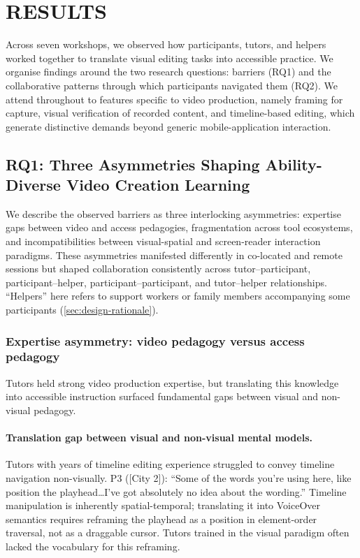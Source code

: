 \section{RESULTS}
\label{sec:results}

Across seven workshops, we observed how participants, tutors, and helpers worked together to translate visual editing tasks into accessible practice. We organise findings around the two research questions: barriers (RQ1) and the collaborative patterns through which participants navigated them (RQ2). We attend throughout to features specific to video production, namely framing for capture, visual verification of recorded content, and timeline-based editing, which generate distinctive demands beyond generic mobile-application interaction.

\subsection{RQ1: Three Asymmetries Shaping Ability-Diverse Video Creation Learning}

We describe the observed barriers as three interlocking asymmetries: expertise gaps between video and access pedagogies, fragmentation across tool ecosystems, and incompatibilities between visual-spatial and screen-reader interaction paradigms. These asymmetries manifested differently in co-located and remote sessions but shaped collaboration consistently across tutor--participant, participant--helper, participant--participant, and tutor--helper relationships. ``Helpers'' here refers to support workers or family members accompanying some participants (\autoref{sec:design-rationale}).

\subsubsection{Expertise asymmetry: video pedagogy versus access pedagogy}

Tutors held strong video production expertise, but translating this knowledge into accessible instruction surfaced fundamental gaps between visual and non-visual pedagogy.

\paragraph{Translation gap between visual and non-visual mental models.}
Tutors with years of timeline editing experience struggled to convey timeline navigation non-visually. P3 ([City 2]): ``Some of the words you're using here, like position the playhead\ldots I've got absolutely no idea about the wording.'' Timeline manipulation is inherently spatial-temporal; translating it into VoiceOver semantics requires reframing the playhead as a position in element-order traversal, not as a draggable cursor. Tutors trained in the visual paradigm often lacked the vocabulary for this reframing.

